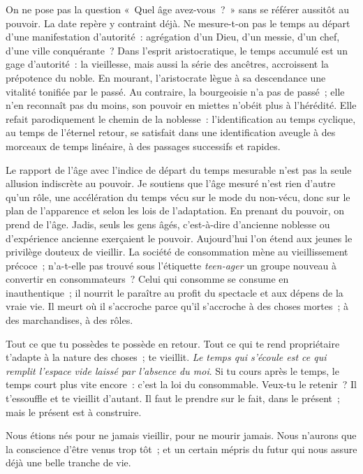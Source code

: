 \documentclass[french,twoside]{book} %
\newcommand{\astermono}{\medskip\centerline{\color{rubric}\large\selectfont{\syms ✻}}\medskip\par}%
\begin{document}
\astermono

\noindent On ne pose pas la question « Quel âge avez-vous ? » sans se référer aussitôt au pouvoir. La date repère y contraint déjà. Ne mesure-t-on pas le temps au départ d’une manifestation d’autorité : agrégation d’un Dieu, d’un messie, d’un chef, d’une ville conquérante ? Dans l’esprit aristocratique, le temps accumulé est un gage d’autorité : la vieillesse, mais aussi la série des ancêtres, accroissent la prépotence du noble. En mourant, l’aristocrate lègue à sa descendance une vitalité tonifiée par le passé. Au contraire, la bourgeoisie n’a pas de passé ; elle n’en reconnaît pas du moins, son pouvoir en miettes n’obéit plus à l’hérédité. Elle refait parodiquement le chemin de la noblesse : l’identification au temps cyclique, au temps de l’éternel retour, se satisfait dans une identification aveugle à des morceaux de temps linéaire, à des passages successifs et rapides.\par
Le rapport de l’âge avec l’indice de départ du temps mesurable n’est pas la seule allusion indiscrète au pouvoir. Je soutiens que l’âge mesuré n’est rien d’autre qu’un rôle, une accélération du temps vécu sur le mode du non-vécu, donc sur le plan de l’apparence et selon les lois de l’adaptation. En prenant du pouvoir, on prend de l’âge. Jadis, seuls les gens âgés, c’est-à-dire d’ancienne noblesse ou d’expérience ancienne exerçaient le pouvoir. Aujourd’hui l’on étend aux jeunes le privilège douteux de vieillir. La société de consommation mène au vieillissement précoce ; n’a-t-elle pas trouvé sous l’étiquette \emph{teen-ager} un groupe nouveau à convertir en consommateurs ? Celui qui consomme se consume en inauthentique ; il nourrit le paraître au profit du spectacle et aux dépens de la vraie vie. Il meurt où il s’accroche parce qu’il s’accroche à des choses mortes ; à des marchandises, à des rôles.\par
Tout ce que tu possèdes te possède en retour. Tout ce qui te rend propriétaire t’adapte à la nature des choses ; te vieillit. \emph{Le temps qui s’écoule est ce qui remplit l’espace vide laissé par l’absence du moi}. Si tu cours après le temps, le temps court plus vite encore : c’est la loi du consommable. Veux-tu le retenir ? Il t’essouffle et te vieillit d’autant. Il faut le prendre sur le fait, dans le présent ; mais le présent est à construire.\par
Nous étions nés pour ne jamais vieillir, pour ne mourir jamais. Nous n’aurons que la conscience d’être venus trop tôt ; et un certain mépris du futur qui nous assure déjà une belle tranche de vie.
\end{document}
